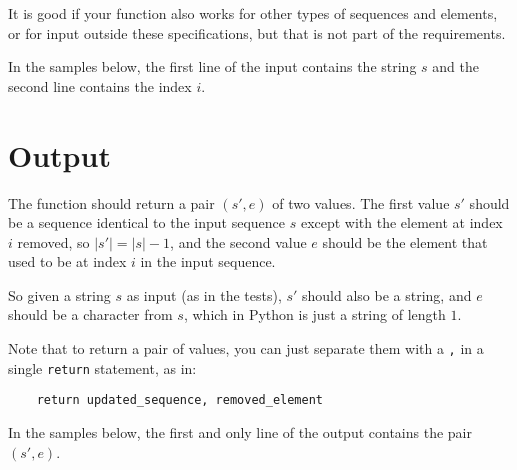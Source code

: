 It is good if your function also works for other types of sequences and elements,
or for input outside these specifications,
but that is not part of the requirements.

In the samples below, the first line of the input contains the string $s$
and the second line contains the index $i$.

\section*{Output}
The function should return a pair $(s', e)$ of two values.
The first value $s'$ should be a sequence identical to the input sequence $s$
except with the element at index $i$ removed,
so $|s'| = |s| - 1$,
and the second value $e$ should be the element
that used to be at index $i$ in the input sequence.

So given a string $s$ as input (as in the tests),
$s'$ should also be a string,
and $e$ should be a character from $s$,
which in Python is just a string of length $1$.

Note that to return a pair of values,
you can just separate them with a \texttt{,}
in a single \texttt{return} statement, as in:
\begin{verbatim}
    return updated_sequence, removed_element
\end{verbatim}

In the samples below,
the first and only line of the output contains the pair $(s', e)$.
